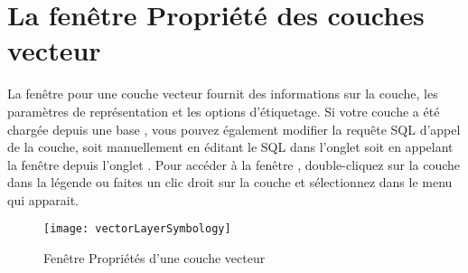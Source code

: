 \section{La fenêtre Propriété des couches vecteur}\label{sec:vectorprops}

La fenêtre  pour une couche vecteur fournit des informations sur la couche, les paramètres de représentation et les options d'étiquetage. Si votre couche a été chargée depuis une base \ppg, vous pouvez également modifier la requête SQL d'appel de la couche, soit manuellement en éditant le SQL dans l'onglet  soit en appelant la fenêtre  depuis l'onglet . Pour accéder à la fenêtre , double-cliquez sur la couche dans la légende ou faites un clic droit sur la couche et sélectionnez  dans le menu qui apparait.

\begin{figure}[ht]
  \begin{center}
  \texttt{[image: vectorLayerSymbology]}
  \caption{Fenêtre Propriétés d'une couche vecteur \nixcaption}\label{fig:vector_symbology}
\end{center}
\end{figure}

